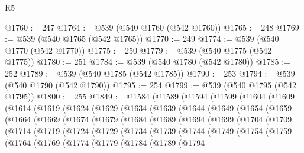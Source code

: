 \begin{lexlean}{R5}
\begin{coremodule}
@1760 := 247
@1764 := @539 (@540 @1760 (@542 @1760))
@1765 := 248
@1769 := @539 (@540 @1765 (@542 @1765))
@1770 := 249
@1774 := @539 (@540 @1770 (@542 @1770))
@1775 := 250
@1779 := @539 (@540 @1775 (@542 @1775))
@1780 := 251
@1784 := @539 (@540 @1780 (@542 @1780))
@1785 := 252
@1789 := @539 (@540 @1785 (@542 @1785))
@1790 := 253
@1794 := @539 (@540 @1790 (@542 @1790))
@1795 := 254
@1799 := @539 (@540 @1795 (@542 @1795))
@1800 := 255
@1849 := @1584
    (@1589
      (@1594
        (@1599
          (@1604
            (@1609
              (@1614
                (@1619
                  (@1624
                    (@1629
                      (@1634
                        (@1639
                          (@1644
                            (@1649
                              (@1654
                                (@1659
                                  (@1664
                                    (@1669
                                      (@1674
                                        (@1679
                                          (@1684
                                            (@1689
                                              (@1694
                                                (@1699
                                                  (@1704
                                                    (@1709
                                                      (@1714
                                                        (@1719
                                                          (@1724
                                                            (@1729
                                                              (@1734
                                                                (@1739
                                                                  (@1744
                                                                    (@1749
                                                                      (@1754
                                                                        (@1759
                                                                          (@1764
                                                                            (@1769
                                                                              (@1774
                                                                                (@1779
                                                                                  (@1784
                                                                                    (@1789
                                                                                      (@1794

\end{coremodule}
\end{lexlean}
